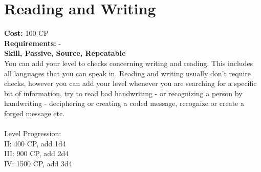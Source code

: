 \section{Reading and Writing}
\textbf{Cost:} 100 CP\\
\textbf{Requirements:} -\\
\textbf{Skill, Passive, Source, Repeatable}\\
You can add your level to checks concerning writing and reading. This includes all languages that you can speak in. Reading and writing usually don't require checks, however you can add your level whenever you are searching for a specific bit of information, try to read bad handwriting - or recognizing a person by handwriting - deciphering or creating a coded message, recognize or create a forged message etc.\\
\\
Level Progression:\\
II: 400 CP, add 1d4\\
III: 900 CP, add 2d4\\
IV: 1500 CP, add 3d4\\